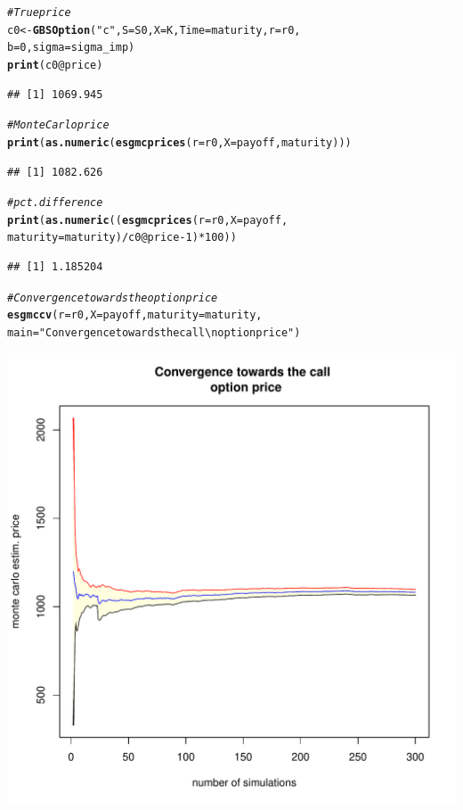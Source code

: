 \documentclass[a4paper]{article}\usepackage[]{graphicx}\usepackage[]{color}
\makeatletter
\def\maxwidth{ %
  \ifdim\Gin@nat@width>\linewidth
    \linewidth
  \else
    \Gin@nat@width
  \fi
}
\newcommand{\hlnum}[1]{\textcolor[rgb]{0.686,0.059,0.569}{#1}}%
\newcommand{\hlstr}[1]{\textcolor[rgb]{0.192,0.494,0.8}{#1}}%
\newcommand{\hlcom}[1]{\textcolor[rgb]{0.678,0.584,0.686}{\textit{#1}}}%
\newcommand{\hlopt}[1]{\textcolor[rgb]{0,0,0}{#1}}%
\newcommand{\hlstd}[1]{\textcolor[rgb]{0.345,0.345,0.345}{#1}}%
\newcommand{\hlkwb}[1]{\textcolor[rgb]{0.69,0.353,0.396}{#1}}%
\newcommand{\hlkwc}[1]{\textcolor[rgb]{0.333,0.667,0.333}{#1}}%
\newcommand{\hlkwd}[1]{\textcolor[rgb]{0.737,0.353,0.396}{\textbf{#1}}}%
\newenvironment{kframe}{%
 \def\at@end@of@kframe{}%
 \ifinner\ifhmode%
  \def\at@end@of@kframe{\end{minipage}}%
  \begin{minipage}{\columnwidth}%
 \fi\fi%
 \def\FrameCommand##1{\hskip\@totalleftmargin \hskip-\fboxsep
 \colorbox{shadecolor}{##1}\hskip-\fboxsep
     \hskip-\linewidth \hskip-\@totalleftmargin \hskip\columnwidth}%
 \MakeFramed {\advance\hsize-\width
   \@totalleftmargin\z@ \linewidth\hsize
   \@setminipage}}%
 {\par\unskip\endMakeFramed%
 \at@end@of@kframe}
\newenvironment{knitrout}{}{} %
\makeatother
\begin{document}
\begin{knitrout}
\begin{kframe}
\begin{alltt}
\hlcom{# True price}
\hlstd{c0} \hlkwb{<-} \hlkwd{GBSOption}\hlstd{(}\hlstr{"c"}\hlstd{,} \hlkwc{S} \hlstd{= S0,} \hlkwc{X} \hlstd{= K,} \hlkwc{Time} \hlstd{= maturity,} \hlkwc{r} \hlstd{= r0,}
                \hlkwc{b} \hlstd{=} \hlnum{0}\hlstd{,} \hlkwc{sigma} \hlstd{= sigma_imp)}
\hlkwd{print}\hlstd{(c0}\hlopt{@}\hlkwc{price}\hlstd{)}
\end{alltt}
\begin{verbatim}
## [1] 1069.945
\end{verbatim}
\begin{alltt}
\hlcom{# Monte Carlo price}
\hlkwd{print}\hlstd{(}\hlkwd{as.numeric}\hlstd{(}\hlkwd{esgmcprices}\hlstd{(}\hlkwc{r} \hlstd{= r0,} \hlkwc{X} \hlstd{= payoff, maturity)))}
\end{alltt}
\begin{verbatim}
## [1] 1082.626
\end{verbatim}
\begin{alltt}
\hlcom{# pct. difference}
\hlkwd{print}\hlstd{(}\hlkwd{as.numeric}\hlstd{((}\hlkwd{esgmcprices}\hlstd{(}\hlkwc{r} \hlstd{= r0,} \hlkwc{X} \hlstd{= payoff,}
             \hlkwc{maturity} \hlstd{= maturity)}\hlopt{/}\hlstd{c0}\hlopt{@}\hlkwc{price} \hlopt{-} \hlnum{1}\hlstd{)}\hlopt{*}\hlnum{100}\hlstd{))}
\end{alltt}
\begin{verbatim}
## [1] 1.185204
\end{verbatim}
\begin{alltt}
\hlcom{# Convergence towards the option price}
\hlkwd{esgmccv}\hlstd{(}\hlkwc{r} \hlstd{= r0,} \hlkwc{X} \hlstd{= payoff,} \hlkwc{maturity} \hlstd{= maturity,}
        \hlkwc{main} \hlstd{=} \hlstr{"Convergence towards the call \textbackslash{}n option price"}\hlstd{)}
\end{alltt}
\end{kframe}
\includegraphics[width=\maxwidth]{figure/_example_pricing-1} 

\end{knitrout}
\end{document}
